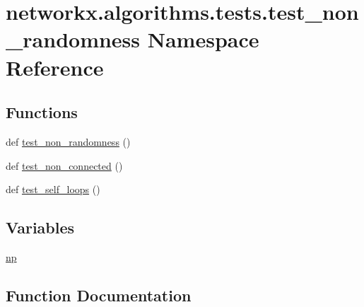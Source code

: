 \hypertarget{namespacenetworkx_1_1algorithms_1_1tests_1_1test__non__randomness}{}\section{networkx.\+algorithms.\+tests.\+test\+\_\+non\+\_\+randomness Namespace Reference}
\label{namespacenetworkx_1_1algorithms_1_1tests_1_1test__non__randomness}
\subsection*{Functions}
\begin{DoxyCompactItemize}
\item 
def \hyperlink{namespacenetworkx_1_1algorithms_1_1tests_1_1test__non__randomness_a6b20c3468d7ecf6e7932bfcdc0b61c76}{test\+\_\+non\+\_\+randomness} ()
\item 
def \hyperlink{namespacenetworkx_1_1algorithms_1_1tests_1_1test__non__randomness_a1f1d577c8037c05394aad6c9dc977be8}{test\+\_\+non\+\_\+connected} ()
\item 
def \hyperlink{namespacenetworkx_1_1algorithms_1_1tests_1_1test__non__randomness_aaf39898477c7fb30d29f8f2c15c3801b}{test\+\_\+self\+\_\+loops} ()
\end{DoxyCompactItemize}
\subsection*{Variables}
\begin{DoxyCompactItemize}
\item 
\hyperlink{namespacenetworkx_1_1algorithms_1_1tests_1_1test__non__randomness_afaf197faba137df9e977858e9f4e69fd}{np}
\end{DoxyCompactItemize}


\subsection{Function Documentation}
\mbox{\label{namespacenetworkx_1_1algorithms_1_1tests_1_1test__non__randomness_a1f1d577c8037c05394aad6c9dc977be8}} 
